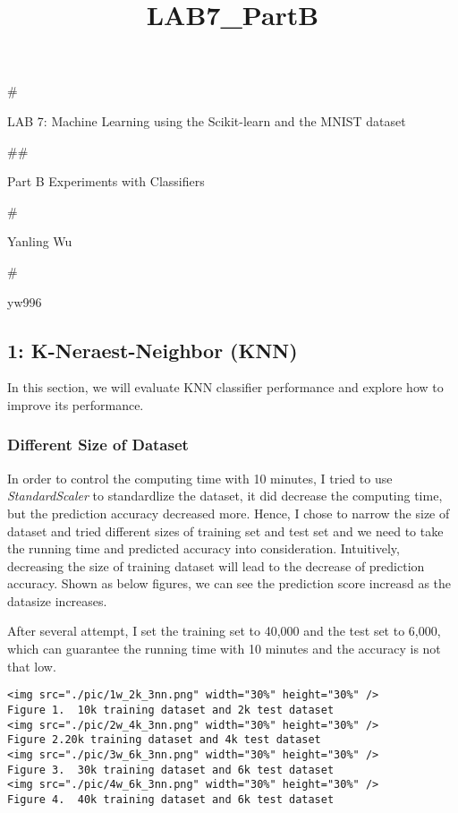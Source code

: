 \documentclass[11pt]{article}
\title{LAB7\_PartB}
\begin{document}
    
    
    \maketitle
    
    

    
    \#

LAB 7: Machine Learning using the Scikit-learn and the MNIST dataset

\#\#

Part B Experiments with Classifiers

\#

Yanling Wu

\#

yw996

\subsection{\texorpdfstring{\textbf{1: K-Neraest-Neighbor
(KNN)}}{1: K-Neraest-Neighbor (KNN)}}\label{k-neraest-neighbor-knn}

In this section, we will evaluate KNN classifier performance and explore
how to improve its performance.

\subsubsection{Different Size of
Dataset}\label{different-size-of-dataset}

In order to control the computing time with 10 minutes, I tried to use
\emph{StandardScaler} to standardlize the dataset, it did decrease the
computing time, but the prediction accuracy decreased more. Hence, I
chose to narrow the size of dataset and tried different sizes of
training set and test set and we need to take the running time and
predicted accuracy into consideration. Intuitively, decreasing the size
of training dataset will lead to the decrease of prediction accuracy.
Shown as below figures, we can see the prediction score increasd as the
datasize increases.

After several attempt, I set the training set to 40,000 and the test set
to 6,000, which can guarantee the running time with 10 minutes and the
accuracy is not that low.

\begin{verbatim}
<img src="./pic/1w_2k_3nn.png" width="30%" height="30%" />  
Figure 1.  10k training dataset and 2k test dataset
<img src="./pic/2w_4k_3nn.png" width="30%" height="30%" />
Figure 2.20k training dataset and 4k test dataset
<img src="./pic/3w_6k_3nn.png" width="30%" height="30%" />
Figure 3.  30k training dataset and 6k test dataset
<img src="./pic/4w_6k_3nn.png" width="30%" height="30%" />
Figure 4.  40k training dataset and 6k test dataset
\end{verbatim}
\end{document}
